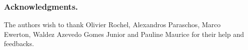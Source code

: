 \documentclass[runningheads,a4paper]{llncs}
\begin{document}
\subsubsection*{Acknowledgments.} 

The authors wish to thank Olivier Rochel, Alexandros Paraschos, Marco Ewerton, Waldez Azevedo Gomes Junior and Pauline Maurice for their help and feedbacks.

%
%
%
\end{document}
